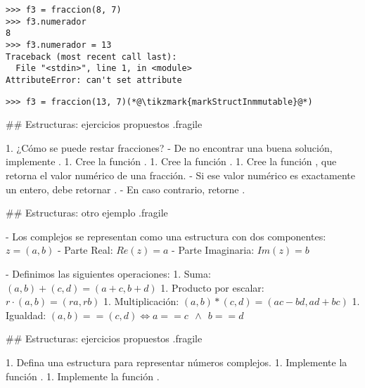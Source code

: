 \pause

\begin{lstlisting}
>>> f3 = fraccion(8, 7)
>>> f3.numerador
8
>>> f3.numerador = 13
Traceback (most recent call last):
  File "<stdin>", line 1, in <module>
AttributeError: can't set attribute
\end{lstlisting}

\pause

\begin{lstlisting}
>>> f3 = fraccion(13, 7)(*@\tikzmark{markStructInmmutable}@*)
\end{lstlisting}


## Estructuras: ejercicios propuestos {.fragile}

1. ¿Cómo se puede restar fracciones?
    - De no encontrar una buena solución, implemente .
1. Cree la función .
1. Cree la función .
1. Cree la función , que retorna el valor numérico de una fracción.
    - Si ese valor numérico es exactamente un entero, debe retornar .
    - En caso contrario, retorne .


## Estructuras: otro ejemplo {.fragile}


- Los complejos se representan como una estructura con dos componentes: $z = (a, b)$
    - Parte Real: $Re(z) = a$
    - Parte Imaginaria: $Im(z) = b$

\vfill

- Definimos las siguientes operaciones:
    1. Suma: $(a, b) + (c, d) = (a + c, b + d)$
    1. Producto por escalar: $r \cdot (a, b) = (ra, rb)$
    1. Multiplicación: $(a, b) * (c, d) = (ac - bd, ad + bc)$
    1. Igualdad: $(a, b) == (c, d) \iff a == c~~ \land~~ b == d$

## Estructuras: ejercicios propuestos {.fragile}

1. Defina una estructura para representar números complejos.
1. Implemente la función .
1. Implemente la función .
